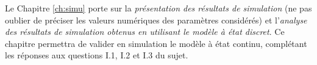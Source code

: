 \vspace{2cm}
Le Chapitre \ref{ch:simu} porte sur la \textit{présentation des résultats de simulation} (ne pas oublier de préciser les valeurs numériques des paramètres considérés) et l’\textit{analyse des résultats de simulation obtenus en utilisant le modèle à état discret}.
Ce chapitre permettra de valider en simulation le modèle à état continu, complétant les réponses aux questions I.1, I.2 et I.3 du sujet.
